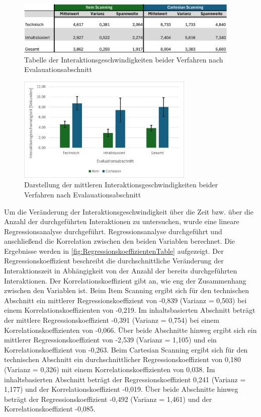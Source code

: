 \begin{figure}[tbh]
    \centering
    \includegraphics[width=0.95\textwidth]{images/Results/Interaktionsgeschwindigkeiten-Table.png}
    \caption{Tabelle der Interaktionsgeschwindigkeiten beider Verfahren nach Evalauationsabschnitt}
    \label{fig:InteraktionsgeschwindigkeitenTable}
\end{figure}

\begin{figure}[tbh]
    \centering
    \includegraphics[width=0.75\textwidth]{images/Results/Interaktionsgeschwindigkeiten.png}
    \caption{Darstellung der mittleren Interaktionsgeschwindigkeiten beider Verfahren nach Evalauationsabschnitt}
    \label{fig:Interaktionsgeschwindigkeiten}
\end{figure}

Um die Veränderung der Interaktionsgeschwindigkeit über die Zeit bzw. über die Anzahl der durchgeführten Interaktionen zu untersuchen, wurde eine lineare Regressionsanalyse durchgeführt. Regressionsanalyse durchgeführt und anschließend die Korrelation zwischen den beiden Variablen berechnet. Die Ergebnisse werden in \autoref{fig:RegressionskoeffizientenTable} aufgezeigt. Der Regressionskoeffizient beschreibt die durchschnittliche Veränderung der Interaktionszeit in Abhängigkeit von der Anzahl der bereits durchgeführten Interaktionen. Der Korrelationskoeffizient gibt an, wie eng der Zusammenhang zwischen den Variablen ist. 
Beim Item Scanning ergibt sich für den technischen Abschnitt ein mittlerer Regressionskoeffizient von -0,839 (Varianz = 0,503) bei einem Korrelationskoeffizienten von -0,219. Im inhaltsbasierten Abschnitt beträgt der mittlere Regressionskoeffizient -0,391 (Varianz = 0,754) bei einem Korrelationskoeffizienten von -0,066. Über beide Abschnitte hinweg ergibt sich ein mittlerer Regressionskoeffizient von -2,539 (Varianz = 1,105) und ein Korrelationskoeffizient von -0,263.
Beim Cartesian Scanning ergibt sich für den technischen Abschnitt ein durchschnittlicher Regressionskoeffizient von 0,180 (Varianz = 0,326) mit einem Korrelationskoeffizienten von 0,038. Im inhaltsbasierten Abschnitt beträgt der Regressionskoeffizient 0,241 (Varianz = 1,177) und der Korrelationskoeffizient -0,019. Über beide Abschnitte hinweg beträgt der Regressionskoeffizient -0,492 (Varianz = 1,461) und der Korrelationskoeffizient -0,085.


